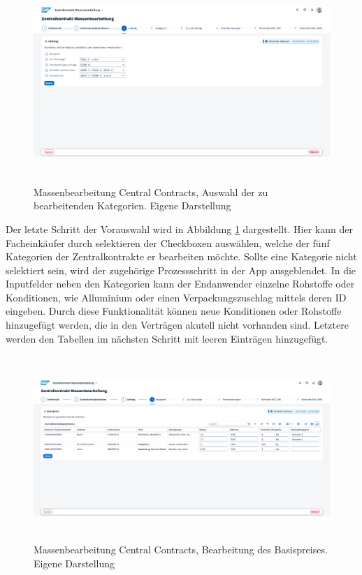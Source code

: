 \begin{figure}[H]
    \centering
    \includegraphics[height=7.65cm]{Bilder/Praxisteil-KL-Schritt-3.png}
    \caption[Massenbearbeitung Central Contracts, Auswahl der zu bearbeitenden Kategorien]{Massenbearbeitung Central Contracts, Auswahl der zu bearbeitenden Kategorien. Eigene Darstellung}
    \label{fig:PraxisKLSchritt3}
\end{figure}

Der letzte Schritt der Vorauswahl wird in Abbildung \ref{fig:PraxisKLSchritt3} dargestellt. Hier kann der Facheinkäufer durch selektieren der Checkboxen auswählen, welche der fünf Kategorien der Zentralkontrakte er bearbeiten möchte. Sollte eine Kategorie nicht selektiert sein, wird der zugehörige Prozessschritt in der App ausgeblendet. In die Inputfelder neben den Kategorien kann der Endanwender einzelne Rohstoffe oder Konditionen, wie \zB Alluminium oder einen Verpackungszuschlag mittels deren ID eingeben. Durch diese Funktionalität können neue Konditionen oder Rohstoffe hinzugefügt werden, die in den Verträgen akutell nicht vorhanden sind. Letztere werden den Tabellen im nächsten Schritt mit leeren Einträgen hinzugefügt. 

\begin{figure}[H]
    \centering
    \includegraphics[height=6.99cm]{Bilder/Praxisteil-KL-Schritt-4.png}
    \caption[Massenbearbeitung Central Contracts, Bearbeitung des Basispreises]{Massenbearbeitung Central Contracts, Bearbeitung des Basispreises. Eigene Darstellung}
    \label{fig:PraxisKLSchritt4}
\end{figure}


